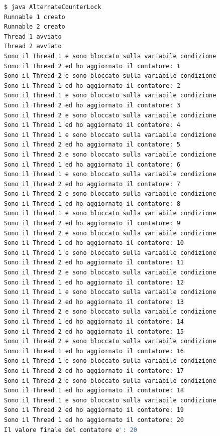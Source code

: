 \begin{lstlisting}[language=Bash]
$ java AlternateCounterLock
Runnable 1 creato
Runnable 2 creato
Thread 1 avviato
Thread 2 avviato
Sono il Thread 1 e sono bloccato sulla variabile condizione
Sono il Thread 2 ed ho aggiornato il contatore: 1
Sono il Thread 2 e sono bloccato sulla variabile condizione
Sono il Thread 1 ed ho aggiornato il contatore: 2
Sono il Thread 1 e sono bloccato sulla variabile condizione
Sono il Thread 2 ed ho aggiornato il contatore: 3
Sono il Thread 2 e sono bloccato sulla variabile condizione
Sono il Thread 1 ed ho aggiornato il contatore: 4
Sono il Thread 1 e sono bloccato sulla variabile condizione
Sono il Thread 2 ed ho aggiornato il contatore: 5
Sono il Thread 2 e sono bloccato sulla variabile condizione
Sono il Thread 1 ed ho aggiornato il contatore: 6
Sono il Thread 1 e sono bloccato sulla variabile condizione
Sono il Thread 2 ed ho aggiornato il contatore: 7
Sono il Thread 2 e sono bloccato sulla variabile condizione
Sono il Thread 1 ed ho aggiornato il contatore: 8
Sono il Thread 1 e sono bloccato sulla variabile condizione
Sono il Thread 2 ed ho aggiornato il contatore: 9
Sono il Thread 2 e sono bloccato sulla variabile condizione
Sono il Thread 1 ed ho aggiornato il contatore: 10
Sono il Thread 1 e sono bloccato sulla variabile condizione
Sono il Thread 2 ed ho aggiornato il contatore: 11
Sono il Thread 2 e sono bloccato sulla variabile condizione
Sono il Thread 1 ed ho aggiornato il contatore: 12
Sono il Thread 1 e sono bloccato sulla variabile condizione
Sono il Thread 2 ed ho aggiornato il contatore: 13
Sono il Thread 2 e sono bloccato sulla variabile condizione
Sono il Thread 1 ed ho aggiornato il contatore: 14
Sono il Thread 2 ed ho aggiornato il contatore: 15
Sono il Thread 2 e sono bloccato sulla variabile condizione
Sono il Thread 1 ed ho aggiornato il contatore: 16
Sono il Thread 1 e sono bloccato sulla variabile condizione
Sono il Thread 2 ed ho aggiornato il contatore: 17
Sono il Thread 2 e sono bloccato sulla variabile condizione
Sono il Thread 1 ed ho aggiornato il contatore: 18
Sono il Thread 1 e sono bloccato sulla variabile condizione
Sono il Thread 2 ed ho aggiornato il contatore: 19
Sono il Thread 1 ed ho aggiornato il contatore: 20
Il valore finale del contatore e': 20
\end{lstlisting}
